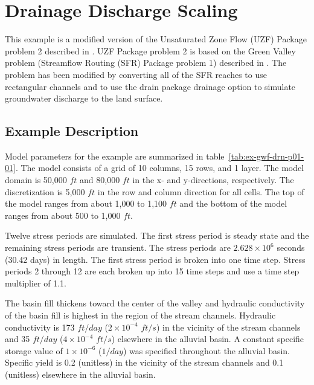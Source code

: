 \section{Drainage Discharge Scaling}

This example is a modified version of the Unsaturated Zone Flow (UZF) Package problem 2 described in \cite{UZF}. UZF Package problem 2 is based on the Green Valley problem (Streamflow Routing (SFR) Package problem 1) described in \cite{modflowsfr1pack}. The problem has been modified by converting all of the SFR reaches to use rectangular channels and to use the drain package drainage option to simulate groundwater discharge to the land surface.                               

\subsection{Example Description}
Model parameters for the example are summarized in table~\ref{tab:ex-gwf-drn-p01-01}.  The model consists of a grid of 10 columns, 15 rows, and 1 layer. The model domain is  50,000 $ft$ and 80,000 $ft$ in the x- and y-directions, respectively. The discretization is 5,000 $ft$ in the row and column direction for all cells. The top of the model ranges from about 1,000 to 1,100 $ft$ and the bottom of the model ranges from about 500 to 1,000 $ft$.

Twelve stress periods are simulated. The first stress period is steady state and the remaining stress periods are transient. The stress periods are $2.628 \times 10^{6}$ seconds (30.42 days) in length. The first stress period is broken into one time step. Stress periods 2 through 12 are each broken up into 15 time steps and use a time step multiplier of 1.1.



The basin fill thickens toward the center of the valley and hydraulic conductivity of the basin fill is highest in the region of the stream channels. Hydraulic conductivity is 173 $ft/day$ ($2 \times 10^{-4}$ $ft/s$) in the vicinity of the stream channels and 35 $ft/day$ ($4 \times 10^{-4}$ $ft/s$) elsewhere in the alluvial basin. A constant specific storage value of $1 \times 10^{-6}$ ($1/day$) was specified throughout the alluvial basin. Specific yield is 0.2 (unitless) in the vicinity of the stream channels and 0.1 (unitless) elsewhere in the alluvial basin.

